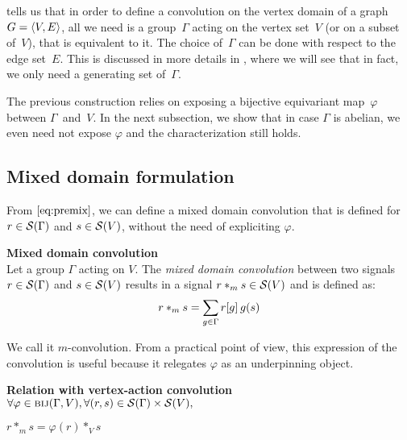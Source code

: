  tells us that in order to define a convolution on the vertex domain of a graph $\gve$, all we need is a group~$\Gamma$ acting on the vertex set~$V$ (or on a subset of~$V$), that is equivalent to it. The choice of~$\Gamma$ can be done with respect to the edge set~$E$. This is discussed in more details in , where we will see that in fact, we only need a generating set of~$\Gamma$.

The previous construction relies on exposing a bijective equivariant map~$\varphi$ between $\Gamma$~and~$V$. In the next subsection, we show that in case $\Gamma$ is abelian, we even need not expose $\varphi$ and the characterization still holds.

\subsection{Mixed domain formulation}

From $\eqref{eq:premix}$, we can define a mixed domain convolution \ie that is defined for $r \in \cs(\Gamma)$ and $s \in \cs(V)$, without the need of expliciting $\varphi$.

\begin{definition}\textbf{Mixed domain convolution}\\
Let a group $\Gamma$ acting on $V$.
The \emph{mixed domain convolution} between two signals $r \in \cs(\Gamma)$ and $s \in \cs(V)$ results in a signal $r \ast_m s \in \cs(V)$ and is defined as:
\begin{gather*}
r \ast_m s = \displaystyle \sum_{g \in \Gamma} r[g] \h{2} g(s)
\end{gather*}
\label{def:convm}
\end{definition}

We call it $m$-convolution. From a practical point of view, this expression of the convolution is useful because it relegates $\varphi$ as an underpinning object.%

\begin{lemma}\textbf{Relation with vertex-action convolution}\\
$\forall \varphi \in \bij(\Gamma, V), \forall (r,s) \in \cs(\Gamma) \times \cs(V),$\\
\centerline{$r \ast_m s = \varphi(r) \ast_{V} s$}
\label{lem:rel3m}
\end{lemma}

